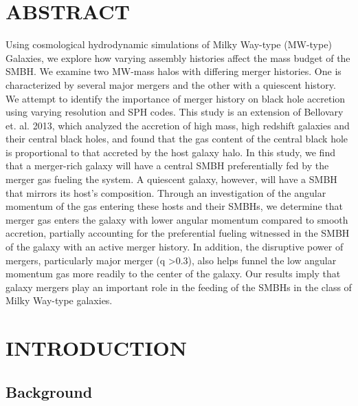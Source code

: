 \documentclass[12pt,headA,chapB]{fiskthesis}
\begin{document}
\newpage
{}
\listoffigures
\thispagestyle{fancy}


\newpage
{}
\chapter*{\normalsize ABSTRACT}
\thispagestyle{empty}
\rhead{\small\thepage}
Using cosmological hydrodynamic simulations of Milky Way-type (MW-type) Galaxies, we explore how varying assembly histories affect the mass budget of the SMBH. We examine two MW-mass halos with differing merger histories. One is characterized by several major mergers and the other with a quiescent history. We attempt to identify the importance of merger history on black hole accretion using varying resolution and SPH codes. This study is an extension of Bellovary et. al. 2013, which analyzed the accretion of high mass, high redshift galaxies and their central black holes, and found that the gas content of the central black hole is proportional to that accreted by the host galaxy halo. In this study, we find that a merger-rich galaxy will have a central SMBH preferentially fed by the merger gas fueling the system. A quiescent galaxy, however, will have a SMBH that mirrors its host's composition. Through an investigation of the angular momentum of the gas entering these hosts and their SMBHs, we determine that merger gas enters the galaxy with lower angular momentum compared to smooth accretion, partially accounting for the preferential fueling witnessed in the SMBH of the galaxy with an active merger history. In addition, the disruptive power of mergers, particularly major merger (q \textgreater 0.3), also helps funnel the low angular momentum gas more readily to the center of the galaxy. Our results imply that galaxy mergers play an important role in the feeding of the SMBHs in the class of Milky Way-type galaxies.
\vspace{4ex}


\mainmatter
\chapter{\normalsize INTRODUCTION}
\section{\normalsize Background}
\thispagestyle{empty}
\end{document}
